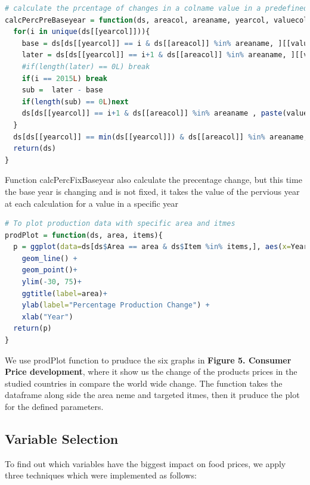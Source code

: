 \documentclass[12pt,a4paper,english]{article}
\begin{document}
\begin{lstlisting}[language= R, captionpos=b,caption=\href{https://github.com/jaidikam/sps_ws1718/tree/master/Qfolder7}{SPL\_Q7\_countries\_exploration.R}]
# calculate the prcentage of changes in a colname value in a predefined year, where the base is for every change is the value from the previous year.
calcPercPreBaseyear = function(ds, areacol, areaname, yearcol, valuecol){
  for(i in unique(ds[[yearcol]])){
    base = ds[ds[[yearcol]] == i & ds[[areacol]] %in% areaname, ][[valuecol]]
    later = ds[ds[[yearcol]] == i+1 & ds[[areacol]] %in% areaname, ][[valuecol]]
    #if(length(later) == 0L) break
    if(i == 2015L) break
    sub =  later - base
    if(length(sub) == 0L)next 
    ds[ds[[yearcol]] == i+1 & ds[[areacol]] %in% areaname , paste(valuecol, "Percent", sep = "_")]= (sub / later) * 100
  }
  ds[ds[[yearcol]] == min(ds[[yearcol]]) & ds[[areacol]] %in% areaname, paste(valuecol, "Percent", sep = "_")]= 0
  return(ds)
}
\end{lstlisting}

Function calcPercFixBaseyear also calculate the precentage change, but this time the base year is changing and is not fixed, it takes the value of the pervious year at each calculation for a value in a specific year   

\begin{lstlisting}[language= R, captionpos=b,caption=\href{https://github.com/jaidikam/sps_ws1718/tree/master/Qfolder7}{SPL\_Q7\_countries\_exploration.R}]
# To plot production data with specific area and itmes
prodPlot = function(ds, area, items){
  p = ggplot(data=ds[ds$Area == area & ds$Item %in% items,], aes(x=Year, y=Percentage, colour=Item)) +
    geom_line() +
    geom_point()+
    ylim(-30, 75)+
    ggtitle(label=area)+
    ylab(label="Percentage Production Change") +
    xlab("Year")
  return(p)
}
\end{lstlisting}
We use prodPlot function to pruduce the six graphs in \textbf{Figure 5. Consumer Price development}, where it show us the change of the products prices in the studied countries in compare the world wide change. The function takes the dataframe along side the area neme and targeted itmes, then it pruduce the plot for the defined parameters. 


\subsection{Variable Selection}

To find out which variables have the biggest impact on food prices, we apply three techniques which were implemented as follows:
\end{document}
